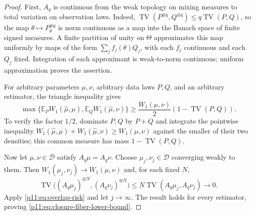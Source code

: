 \documentclass[11pt,letterpaper]{article}
\theoremstyle{definition}
\theoremstyle{remark}
\newcommand{\1}{\mathbf 1}
\begin{document}
\begin{proof}
First, $A_q$ is continuous from the weak topology on mixing measures
to total variation on observation laws.  Indeed,
$\operatorname{TV}(P^{\otimes q},Q^{\otimes q})\leq
q\operatorname{TV}(P,Q)$, so the map
$\theta\mapsto P_\theta^{\otimes q}$ is norm continuous as a map into
the Banach space of finite signed measures.  A finite partition of
unity on $\Theta$ approximates this map uniformly by maps of the form
$\sum_j f_j(\theta)Q_j$, with each $f_j$ continuous and each $Q_j$ fixed.
Integration of each approximant is weak-to-norm continuous; uniform
approximation proves the assertion.

For arbitrary parameters $\mu,\nu$, arbitrary data laws $P,Q$, and
an arbitrary estimator, the triangle inequality gives
\begin{equation}\label{p11:eq:overlap-risk}
 \max\{\mathbb E_P W_1(\widehat\mu,\mu),
         \mathbb E_Q W_1(\widehat\mu,\nu)\}
 \geq\frac{W_1(\mu,\nu)}{2}
                         (1-\operatorname{TV}(P,Q)).
\end{equation}
To verify the factor $1/2$, dominate $P,Q$ by $P+Q$ and integrate
the pointwise inequality
$W_1(\widehat\mu,\mu)+W_1(\widehat\mu,\nu)\geq W_1(\mu,\nu)$
against the smaller of their two densities; this common measure has
mass $1-\operatorname{TV}(P,Q)$.

Now let $\mu,\nu\in\overline{\mathcal D}$ satisfy $A_q\mu=A_q\nu$.
Choose $\mu_j,\nu_j\in\mathcal D$ converging weakly to them.
Then $W_1(\mu_j,\nu_j)\to W_1(\mu,\nu)$ and, for each fixed $N$,
\[
 \operatorname{TV}\big((A_q\mu_j)^{\otimes N},
                       (A_q\nu_j)^{\otimes N}\big)
 \leq N\operatorname{TV}(A_q\mu_j,A_q\nu_j)\longrightarrow0.
\]
Apply \eqref{p11:eq:overlap-risk} and let $j\to\infty$.
The result holds for every estimator, proving
\eqref{p11:eq:closure-fiber-lower-bound}.


\end{proof}
\end{document}
